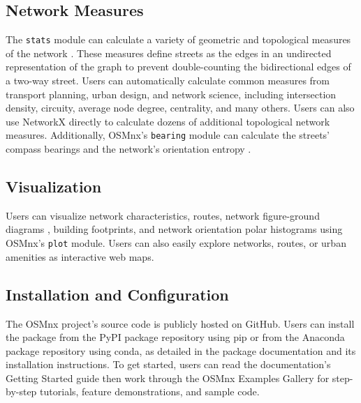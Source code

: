 \documentclass[12pt,letterpaper]{article} %
\begin{document}
\subsection{Network Measures}

The \texttt{stats} module can calculate a variety of geometric and topological measures of the network \citep{boeing_street_2022}. These measures define streets as the edges in an undirected representation of the graph to prevent double-counting the bidirectional edges of a two-way street. Users can automatically calculate common measures from transport planning, urban design, and network science, including intersection density, circuity, average node degree, centrality, and many others. Users can also use NetworkX directly to calculate dozens of additional topological network measures. Additionally, OSMnx's \texttt{bearing} module can calculate the streets' compass bearings and the network's orientation entropy \citep{boeing_urban_2019}.

\subsection{Visualization}

Users can visualize network characteristics, routes, network figure-ground diagrams \citep{boeing_spatial_2021}, building footprints, and network orientation polar histograms \citep{boeing_urban_2019} using OSMnx's \texttt{plot} module. Users can also easily explore networks, routes, or urban amenities as interactive web maps.

\subsection{Installation and Configuration}

The OSMnx project's source code is publicly hosted on GitHub. Users can install the package from the PyPI package repository using pip or from the Anaconda package repository using conda, as detailed in the package documentation and its installation instructions. To get started, users can read the documentation's Getting Started guide then work through the OSMnx Examples Gallery for step-by-step tutorials, feature demonstrations, and sample code.
\end{document}
